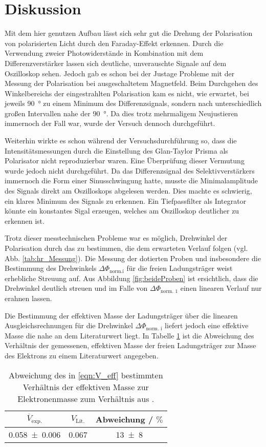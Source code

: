\section{Diskussion}

Mit dem hier genutzen Aufbau lässt sich sehr gut die Drehung der Polarisation von polarisierten Licht durch den Faraday-Effekt erkennen.
Durch die Verwendung zweier Photowiderstände in Kombination mit dem Differenzverstärker lassen sich deutliche, unverauschte Signale auf dem Oszilloskop sehen.
Jedoch gab es schon bei der Justage Probleme mit der Messung der Polarisation bei ausgeschaltetem Magnetfeld.
Beim Durchgehen des Winkelbereichs der eingestrahlten Polarisation kam es nicht, wie erwartet, bei jeweils \SI{90}{\degree} zu einem Minimum des Differenzsignals,
sondern nach unterschiedlich großen Intervallen nahe der \SI{90}{\degree}.
Da dies trotz mehrmaligem Neujustieren immernoch der Fall war, wurde der Versuch dennoch durchgeführt.
\par \medskip
Weiterhin wirkte es schon während der Versuchsdurchführung so, dass die Intensitätsmessungen durch die Einstellung des Glan-Taylor Prisma als Polarisator nicht reproduzierbar waren.
Eine Überprüfung dieser Vermutung wurde jedoch nicht durchgeführt.
Da das Differenzsignal des Selektivverstärkers immernoch die Form einer Sinusschwingung hatte, musste die Minimalamplitude des Signals direkt am Oszilloskops abgelesen werden.
Dies machte es schwierig, ein klares Minimum des Signals zu erkennen. Ein Tiefpassfilter als Integrator könnte ein konstantes Sigal erzeugen, welches am Oszilloskop deutlicher zu erkennen ist.
\par \medskip
Trotz dieser messtechnischen Probleme war es möglich, Drehwinkel der Polarisation durch das  zu bestimmen, die dem erwarteten Verlauf folgen (vgl. Abb. \ref{tab:hr_Messung}).
Die Messung der dotierten Proben und insbesondere die Bestimmung des Drehwinkels $\Delta \Phi_\text{norm.i}$ für die freien Ladungsträger weist erhebliche Streuung auf.
Aus Abbildung \ref{fig:beideProben} ist ersichtlich, dass die Drehwinkel deutlich streuen und im Falle von $\Delta \Phi_\text{norm. 1}$ einen linearen Verlauf nur erahnen lassen.
\par\medskip
Die Bestimmung der effektiven Masse der Ladungsträger über die linearen Ausgleichsrechnungen für die Drehwinkel $\Delta \Phi_\text{norm. i}$ liefert jedoch eine effektive Masse die nahe an dem Literaturwert liegt.
In Tabelle \ref{tab:Abweichung_lit} ist die Abweichung des Verhältnis der gemessenen, effektiven Masse der freien Ladungsträger zur Masse des Elektrons zu einem Literaturwert angegeben.
\begin{table}[H]
  \centering
  \caption{Abweichung des in \eqref{eqn:V_eff} bestimmten Verhältnis der effektiven Masse zur Elektronenmasse zum Verhältnis aus \cite{eff_lit}.}
  \label{tab:Abweichung_lit}
  \begin{tabular}{ccc}
    \toprule
    $\overline{V}_\text{exp.}$ & $V_\text{Lit.}$ &  Abweichung / $\si{\percent}$ \\
    \midrule
    \num{0.058(6)} & 0.067 & \num{13(8)} \\
    \bottomrule
  \end{tabular}
\end{table}
